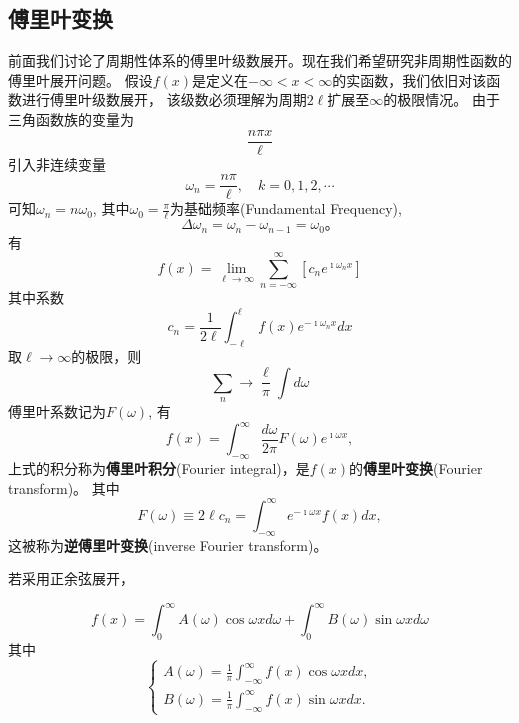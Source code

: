 \subsection{傅里叶变换}
\label{subsec:fourier_transform}
前面我们讨论了周期性体系的傅里叶级数展开。现在我们希望研究非周期性函数的傅里叶展开问题。
假设$f(x)$是定义在$-\infty < x < \infty$的实函数，我们依旧对该函数进行傅里叶级数展开，
该级数必须理解为周期$2\ell$扩展至$\infty$的极限情况。
由于三角函数族的变量为
\[
 \frac{n\pi x}{\ell}    
\]
引入非连续变量
\[\omega_n = \frac{n\pi} {\ell}, \quad k = 0,1,2,\cdots
    \]
可知$\omega_n = n \omega_0$, 其中$\omega_0 = \frac{\pi}{\ell}$为基础频率(Fundamental Frequency),
\[\Delta \omega_n = \omega_n - \omega_{n-1} = \omega_0 \textrm{。} \] 
有
\begin{equation}
    f(x) = \lim_{\ell\to \infty} \sum_{n=-\infty}^{\infty} \left[
        c_n e^{\imath \omega_n x}
    \right]
\end{equation}
其中系数
\begin{equation}
    c_n = \frac{1}{2\ell} \int_{-\ell}^{\ell} f(x) e^{-\imath \omega_n x} dx 
\end{equation}
取$\ell\to \infty$的极限，则
\[
  \sum_n \to  \frac{ \ell}{\pi}  \int d\omega 
\]
傅里叶系数记为$F(\omega)$,
有
\begin{equation}
    f(x) = \int_{-\infty}^{\infty} \frac{d \omega }{2\pi}F(\omega) e^{\imath \omega x}, %
\end{equation}
上式的积分称为\textbf{傅里叶积分}(Fourier integral)，是$f(x)$的\textbf{傅里叶变换}(Fourier transform)。
其中
\begin{equation}
    F (\omega) \equiv 2\ell c_n = \int_{-\infty}^{\infty} e^{-\imath \omega x} f(x) dx,
\end{equation}
这被称为\textbf{逆傅里叶变换}(inverse Fourier transform)。

若采用正余弦展开，

\begin{equation}
    f(x) =\int_{0}^{\infty} A(\omega) \cos {\omega x} d\omega + \int_{0}^{\infty} B(\omega) \sin {\omega x} d\omega
\end{equation}
其中
\begin{equation}
    \left\{\begin{array}{l}
    A(\omega)=\frac{1}{\pi} \int_{-\infty}^{\infty} f(x) \cos \omega x d x, \\
    B(\omega)=\frac{1}{\pi} \int_{-\infty}^{\infty} f(x) \sin \omega x d x .
    \end{array}\right.
\end{equation}

